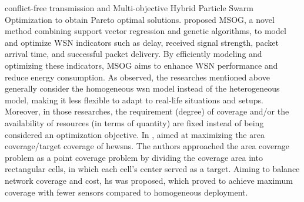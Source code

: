 \documentclass[preprint,12pt]{elsarticle}
\begin{document}
conflict-free transmission and Multi-objective Hybrid Particle Swarm Optimization to obtain Pareto optimal solutions. \citeauthor{Mazloomi2022} \cite{Mazloomi2022} proposed MSOG, a novel method combining support vector regression and genetic algorithms, to model and optimize WSN indicators such as delay, received signal strength, packet arrival time, and successful packet delivery. By efficiently modeling and optimizing these indicators, MSOG aims to enhance WSN performance and reduce energy consumption. As observed, the researches mentioned above generally consider the homogeneous \gls{wsn} model instead of the heterogeneous model, making it less flexible to adapt to real-life situations and setups. Moreover, in those researches, the requirement (degree) of coverage and/or the availability of resources (in terms of quantity) are fixed instead of being considered an optimization objective. In \cite{Al-Fuhaidi2020}, \citeauthor{Al-Fuhaidi2020} aimed at maximizing the area coverage/target coverage of \glspl{hewsn}. The authors approached the area coverage problem as a point coverage problem by dividing the coverage area into rectangular cells, in which each cell's center served as a target. Aiming to balance network coverage and cost, \gls{hs} was proposed, which proved to achieve maximum coverage with fewer sensors compared to homogeneous deployment.
\end{document}
